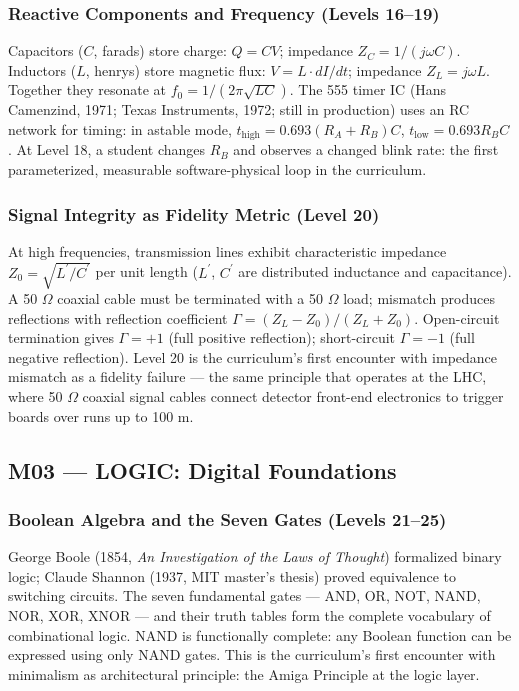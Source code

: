 \documentclass[11pt,letterpaper]{article}
\begin{document}
\subsubsection{Reactive Components and Frequency (Levels 16--19)}

Capacitors ($C$, farads) store charge: $Q = CV$; impedance $Z_C = 1/(j\omega C)$. Inductors
($L$, henrys) store magnetic flux: $V = L \cdot dI/dt$; impedance $Z_L = j\omega L$. Together
they resonate at $f_0 = 1/(2\pi\sqrt{LC})$. The 555 timer IC (Hans Camenzind, 1971; Texas
Instruments, 1972; still in production) uses an RC network for timing: in astable mode,
$t_\text{high} = 0.693(R_A + R_B)C$, $t_\text{low} = 0.693 R_B C$. At Level 18, a student
changes $R_B$ and observes a changed blink rate: the first parameterized, measurable
software-physical loop in the curriculum.

\subsubsection{Signal Integrity as Fidelity Metric (Level 20)}

At high frequencies, transmission lines exhibit characteristic impedance
$Z_0 = \sqrt{L^\prime / C^\prime}$ per unit length ($L^\prime$, $C^\prime$ are distributed
inductance and capacitance). A 50 $\Omega$ coaxial cable must be terminated with a 50 $\Omega$
load; mismatch produces reflections with reflection coefficient
$\Gamma = (Z_L - Z_0)/(Z_L + Z_0)$. Open-circuit termination gives $\Gamma = +1$ (full
positive reflection); short-circuit $\Gamma = -1$ (full negative reflection). Level 20 is the
curriculum's first encounter with impedance mismatch as a fidelity failure --- the same principle
that operates at the LHC, where 50 $\Omega$ coaxial signal cables connect detector front-end
electronics to trigger boards over runs up to 100 m.

\subsection{M03 --- LOGIC: Digital Foundations}

\subsubsection{Boolean Algebra and the Seven Gates (Levels 21--25)}

George Boole (1854, \textit{An Investigation of the Laws of Thought}) formalized binary logic;
Claude Shannon (1937, MIT master's thesis) proved equivalence to switching circuits. The seven
fundamental gates --- AND, OR, NOT, NAND, NOR, XOR, XNOR --- and their truth tables form the
complete vocabulary of combinational logic. NAND is functionally complete: any Boolean function
can be expressed using only NAND gates. This is the curriculum's first encounter with minimalism
as architectural principle: the Amiga Principle at the logic layer.
\end{document}
